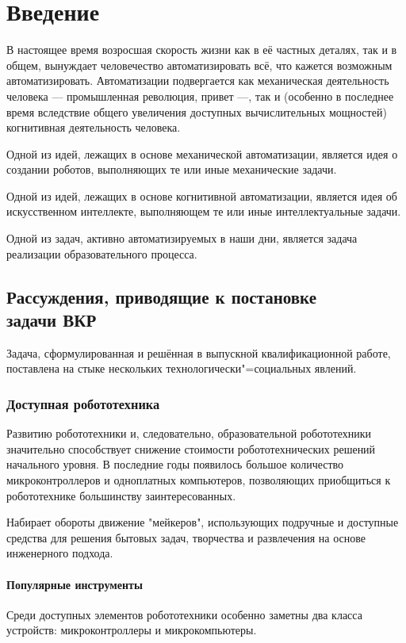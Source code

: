 \chapter{Введение}

В настоящее время возросшая скорость жизни как в её частных деталях, так и в общем, вынуждает человечество автоматизировать всё, что кажется возможным автоматизировать. Автоматизации подвергается как механическая деятельность человека --- промышленная революция, привет ---, так и (особенно в последнее время вследствие общего увеличения доступных вычислительных мощностей) когнитивная деятельность человека.

Одной из идей, лежащих в основе механической автоматизации, является идея о создании роботов, выполняющих те или иные механические задачи.

Одной из идей, лежащих в основе когнитивной автоматизации, является идея об искусственном интеллекте, выполняющем те или иные интеллектуальные задачи.

Одной из задач, активно автоматизируемых в наши дни, является задача реализации образовательного процесса.

\section{Рассуждения, приводящие к постановке\\ задачи ВКР}
Задача, сформулированная и решённая в выпускной квалификационной работе, поставлена на стыке нескольких технологически"=социальных явлений.

\subsection{Доступная робототехника}
Развитию робототехники и, следовательно, образовательной робототехники значительно способствует снижение стоимости робототехнических решений начального уровня. В последние годы появилось большое количество микроконтроллеров и одноплатных компьютеров, позволяющих приобщиться к робототехнике большинству заинтересованных.

Набирает обороты движение "мейкеров", использующих подручные и доступные средства для решения бытовых задач, творчества и развлечения на основе инженерного подхода.

\subsubsection{Популярные инструменты} \label{popular-instruments}
Среди доступных элементов робототехники особенно заметны два класса устройств: микроконтроллеры и микрокомпьютеры.

